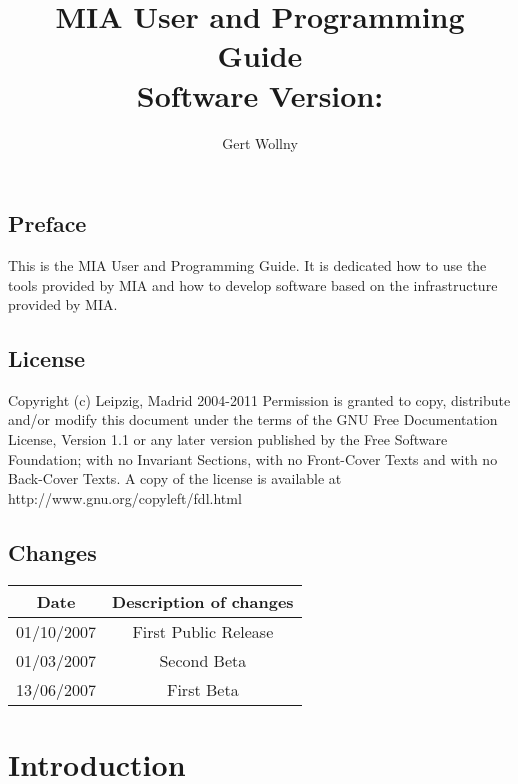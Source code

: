 \documentclass[english, 10pt, a4paper,headsepline,openany]{scrbook}
\begin{document}
\vfill{}
\title{MIA User and Programming Guide \\Software Version: \miaversion}
\vfill{}


\author{Gert Wollny}

\maketitle

\section*{Preface}

This is the MIA User and Programming Guide. 
It is dedicated how to use the tools provided by MIA and how to develop software based on the infrastructure provided by MIA.


\section*{License}

Copyright (c) Leipzig, Madrid 2004-2011
Permission is granted to copy, distribute and/or modify this document under the terms of the GNU Free Documentation License, Version 1.1
  or any later version published by the Free Software Foundation; with no Invariant Sections, 
  with no Front-Cover Texts and with no Back-Cover Texts. 
A copy of the license is available at http://www.gnu.org/copyleft/fdl.html

\section*{Changes}

\begin{center}
\begin{tabular}{|c|c|}
\hline 
Date  & Description of changes\\
\hline
\hline 
01/10/2007 & First Public Release  \\
01/03/2007 & Second Beta \\
13/06/2007 & First Beta  \\
\hline
\end{tabular}
\end{center}

\tableofcontents{}

\pagestyle{headings}


\chapter{Introduction}
\end{document}
